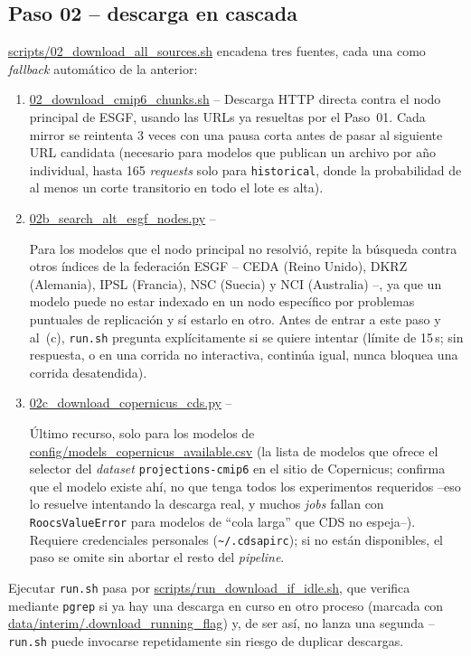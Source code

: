 \documentclass[11pt,a4paper]{article}
\newcommand{\archivo}[1]{\begingroup\hypersetup{urlcolor=black}\url{#1}\endgroup}
\begin{document}
\subsection{Paso 02 -- descarga en cascada}
\label{sec:paso02}
\archivo{scripts/02_download_all_sources.sh} encadena tres fuentes, cada una como \emph{fallback} autom\'atico de la anterior:
\begin{enumerate}[label=(\alph*)]
\item \archivo{02_download_cmip6_chunks.sh} --
Descarga HTTP directa contra el nodo principal de ESGF, usando las URLs ya resueltas por el Paso~01. Cada mirror se reintenta 3 veces con una pausa corta antes de pasar al siguiente URL candidata (necesario para modelos que publican un archivo por a\~no individual, hasta 165 \emph{requests} solo para \texttt{historical}, donde la probabilidad de al menos un corte transitorio en todo el lote es alta).
\item \archivo{02b_search_alt_esgf_nodes.py} --

Para los modelos que el nodo principal no resolvi\'o, repite la b\'usqueda contra otros \'indices de la federaci\'on ESGF -- CEDA (Reino Unido), DKRZ (Alemania), IPSL (Francia), NSC (Suecia) y NCI (Australia) --, ya que un modelo puede no estar indexado en un nodo espec\'ifico por problemas puntuales de replicaci\'on y s\'i estarlo en otro. Antes de entrar a este paso y al~(c), \texttt{run.sh} pregunta expl\'icitamente si se quiere intentar (l\'imite de 15\,s; sin respuesta, o en una corrida no interactiva, contin\'ua igual, nunca bloquea una corrida desatendida).
\item \archivo{02c_download_copernicus_cds.py} --

\'Ultimo recurso, solo para los modelos de \archivo{config/models_copernicus_available.csv} (la lista de modelos que ofrece el selector del \emph{dataset} \texttt{projections-cmip6} en el sitio de Copernicus; confirma que el modelo existe ah\'i, no que tenga todos los experimentos requeridos --eso lo resuelve intentando la descarga real, y muchos \emph{jobs} fallan con \texttt{RoocsValueError} para modelos de ``cola larga'' que CDS no espeja--). Requiere credenciales personales (\texttt{\textasciitilde/.cdsapirc}); si no est\'an disponibles, el paso se omite sin abortar el resto del \emph{pipeline}.
\end{enumerate}
Ejecutar \texttt{run.sh} pasa por \archivo{scripts/run_download_if_idle.sh}, que verifica mediante \texttt{pgrep} si ya hay una descarga en curso en otro proceso (marcada con \archivo{data/interim/.download_running_flag}) y, de ser as\'i, no lanza una segunda -- \texttt{run.sh} puede invocarse repetidamente sin riesgo de duplicar descargas.
\end{document}
